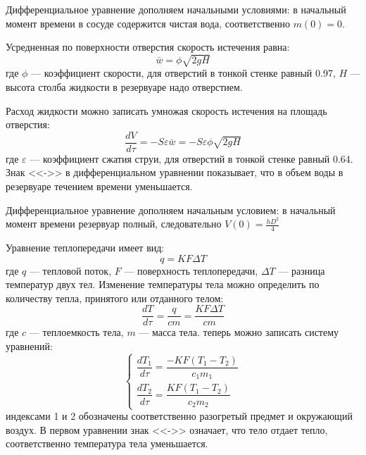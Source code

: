 Дифференциальное уравнение дополняем начальными условиями: в начальный момент времени в сосуде содержится чистая вода, соответственно $m(0)=0.$


Усредненная по поверхности отверстия скорость истечения равна:
\begin{equation}
	\bar{w}=\phi \sqrt{2gH}
\end{equation} 
где $\phi$ --- коэффициент скорости, для отверстий в тонкой стенке равный 0.97, $H$ --- высота столба жидкости в резервуаре надо отверстием.

Расход жидкости можно записать умножая скорость истечения на площадь отверстия:
\begin{equation}
	\dfrac{d V}{d \tau} = - S \varepsilon \bar{w}= -S \varepsilon  \phi \sqrt{2gH}
\end{equation}
где $\varepsilon$ --- коэффициент сжатия струи, для отверстий в тонкой стенке равный 0.64. Знак  <<->> в дифференциальном уравнении показывает,  что в объем воды в резервуаре течением времени уменьшается. 

Дифференциальное уравнение дополняем начальным условием: в начальный момент времени резервуар полный, следовательно $V(0)=\frac{h D^2}{4}$


 
Уравнение теплопередачи имеет вид:
\begin{equation}
	q=K F \Delta T
\end{equation}
где $q$ --- тепловой поток, $F$ --- поверхность теплопередачи, $\Delta T$ --- разница температур двух тел. Изменение температуры тела можно определить по количеству тепла, принятого или отданного телом:
\begin{equation}
	\dfrac{d T}{d \tau}=\dfrac{q}{c m} = \dfrac{K F \Delta T}{c m}
\end{equation}
где $c$ --- теплоемкость тела, $m$ --- масса тела.
теперь можно записать систему уравнений:
\begin{equation}
	\begin{cases}
	\dfrac{d T_1}{d \tau} = \dfrac{-K F (T_1-T_2)}{c_1 m_1} \\
	\dfrac{d T_2}{d \tau} = \dfrac{K F (T_1-T_2)}{c_2 m_2}
	\end{cases}
\end{equation}
индексами 1 и 2 обозначены соответственно разогретый предмет и окружающий воздух. В первом уравнении знак <<->> означает, что тело отдает тепло, соответственно температура тела уменьшается.

